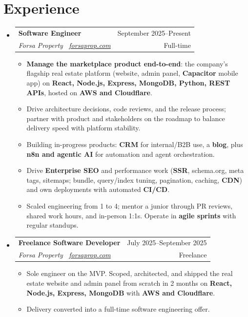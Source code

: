 \documentclass[a4paper,12pt]{article}
\makeatletter
\newcommand{\resumeSubheading}[4]{
\vspace{0.5mm}\item
    \begin{tabular*}{0.98\textwidth}[t]{l@{\extracolsep{\fill}}r}
        \textbf{#1} & {\footnotesize{#4}} \\
        \textit{\footnotesize{#3}} &  \footnotesize{#2}\\
    \end{tabular*}
    \vspace{-2.4mm}
}
\newcommand{\resumeSubHeadingListStart}{\begin{itemize}[leftmargin=*,labelsep=0mm]}
\newcommand{\resumeItemListStart}{\begin{justify}\begin{itemize}[leftmargin=3ex, rightmargin=2ex, noitemsep,labelsep=1.2mm,itemsep=0mm]}
\newcommand{\resumeSubHeadingListEnd}{\end{itemize}\vspace{1mm}}
\newcommand{\resumeItemListEnd}{\end{itemize}\end{justify}\vspace{-2mm}}
\makeatother
\begin{document}
\section{\textbf{Experience}}
  \resumeSubHeadingListStart
    \resumeSubheading
      {Software Engineer}{Full-time}
      {Forsa Property \, \href{https://forsaprop.com}{\normalfont forsaprop.com}}{September 2025--Present}
      \vspace{-1.5mm}
      \resumeItemListStart
    \item {\textbf{Manage the marketplace product end-to-end}: the company's flagship real estate platform (website, admin panel, \textbf{Capacitor} mobile app) on \textbf{React, Node.js, Express, MongoDB, Python, REST APIs}, hosted on \textbf{AWS and Cloudflare}.}
    \item {Drive architecture decisions, code reviews, and the release process; partner with product and stakeholders on the roadmap to balance delivery speed with platform stability.}
    \item {Building in-progress products: \textbf{CRM} for internal/B2B use, a \textbf{blog}, plus \textbf{n8n and agentic AI} for automation and agent orchestration.}
    \item {Drive \textbf{Enterprise SEO} and performance work (\textbf{SSR}, schema.org, meta tags, sitemaps; bundle, query/index tuning, pagination, caching, \textbf{CDN}) and own deployments with automated \textbf{CI/CD}.}
    \item {Scaled engineering from 1 to 4; mentor a junior through PR reviews, shared work hours, and in-person 1:1s. Operate in \textbf{agile sprints} with regular standups.}
    \resumeItemListEnd
    \vspace{1mm}
    \resumeSubheading
      {Freelance Software Developer}{Freelance}
      {Forsa Property \, \href{https://forsaprop.com}{\normalfont forsaprop.com}}{July 2025--September 2025}
      \vspace{-1.5mm}
      \resumeItemListStart
    \item {Sole engineer on the MVP. Scoped, architected, and shipped the real estate website and admin panel from scratch in 2 months on \textbf{React, Node.js, Express, MongoDB} with \textbf{AWS and Cloudflare}.}
    \item {Delivery converted into a full-time software engineering offer.}
    \resumeItemListEnd
  \resumeSubHeadingListEnd
\vspace{-3.5mm}

\end{document}
